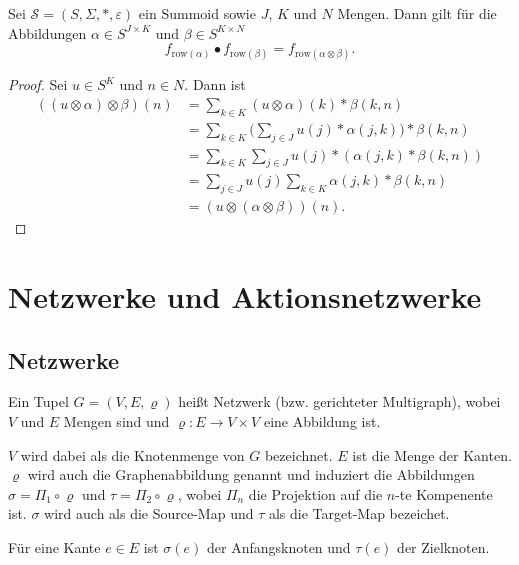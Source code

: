 \documentclass{article}
\begin{document}
\begin{theorem}
  Sei $\mathcal{S} = (S, \Sigma, \ast, \varepsilon)$ ein Summoid
  sowie $J$, $K$ und $N$ Mengen.
  Dann gilt für die Abbildungen $\alpha \in S^{J \times K}$ und $\beta \in S^{K \times N}$
  \begin{equation*}
    f_{\text{row}(\alpha)} \bullet f_{\text{row}(\beta)} = f_{\text{row}(\alpha \otimes \beta)}.
  \end{equation*}
\end{theorem}
\begin{proof}
  Sei $u \in S^K$ und $n \in N$.
  Dann ist
  \begin{align*}
    ((u \otimes \alpha) \otimes \beta)(n)
    &= \sum_{k \in K}(u \otimes \alpha)(k) \ast \beta(k, n) \\
    &= \sum_{k \in K}\bigg(\sum_{j \in J} u(j) \ast \alpha(j, k)\bigg) \ast \beta(k, n) \\
    &= \sum_{k \in K}\sum_{j \in J} u(j) \ast (\alpha(j, k) \ast \beta(k, n)) \\
    &= \sum_{j \in J}u(j)\sum_{k \in K}\alpha(j, k) \ast \beta(k, n) \\
    &= (u \otimes (\alpha \otimes\beta))(n).
  \end{align*}
\end{proof}

\newpage
\section{Netzwerke und Aktionsnetzwerke}

\subsection{Netzwerke}

\begin{definition}
  Ein Tupel $G = (V, E, \varrho)$ heißt Netzwerk (bzw. gerichteter Multigraph), wobei $V$ und $E$ Mengen sind
  und $\varrho \colon E \to V \times V$ eine Abbildung ist.

  $V$ wird dabei als die Knotenmenge von $G$ bezeichnet.
  $E$ ist die Menge der Kanten.
  $\varrho$ wird auch die Graphenabbildung genannt und induziert die Abbildungen $\sigma = \Pi_1 \circ \varrho$ und $\tau = \Pi_2 \circ \varrho$,
  wobei $\Pi_n$ die Projektion auf die $n$-te Kompenente ist.
  $\sigma$ wird auch als die Source-Map und $\tau$ als die Target-Map bezeichet.

  Für eine Kante $e \in E$ ist $\sigma(e)$ der Anfangsknoten und $\tau(e)$ der Zielknoten.  
\end{definition}
\end{document}
